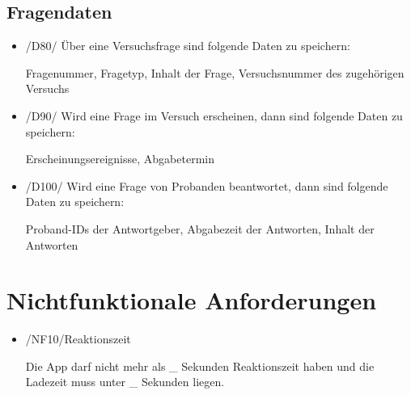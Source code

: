 \documentclass[a4paper]{scrreprt}
\begin{document}
        \section{Fragendaten}
            \begin{itemize}
                \item /D80/ Über eine Versuchsfrage sind folgende Daten zu speichern:
                    \par Fragenummer, Fragetyp, Inhalt der Frage, Versuchsnummer des zugehörigen Versuchs

                \item /D90/ Wird eine Frage im Versuch erscheinen, dann sind folgende Daten zu speichern:
                    \par Erscheinungsereignisse, Abgabetermin

                \item /D100/ Wird eine Frage von Probanden beantwortet, dann sind folgende Daten zu speichern:
                    \par Proband-IDs der Antwortgeber, Abgabezeit der Antworten, Inhalt der Antworten
            \end{itemize}

   \chapter{Nichtfunktionale Anforderungen}
        \begin{itemize}
            \item /NF10/Reaktionszeit

                \par Die App darf nicht mehr als \_ Sekunden Reaktionszeit haben und die Ladezeit muss unter \_ Sekunden liegen.


        \end{itemize}
\end{document}
